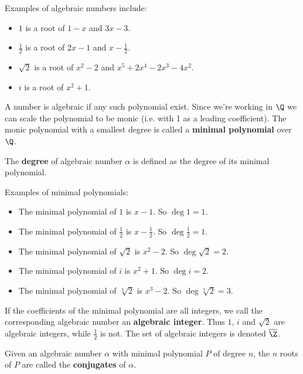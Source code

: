 \begin{ex} Examples of algebraic numbers include:
\begin{itemize}
\item $1$ is a root of $1-x$ and $3x-3$.
\item $\frac{1}{2}$ is a root of $2x - 1$ and $x - \frac{1}{2}$.
\item $\sqrt{2}$ is a root of $x^2 - 2$ and $x^5 + 2x^4 - 2x^3 - 4x^2$.
\item $i$ is a root of $x^2 + 1$.
\end{itemize}
\end{ex}

\begin{df}
A number is algebraic if any such polynomial exist. Since we're working in $\Q$ we can scale the polynomial to be monic (i.e. with 1 as a leading coefficient). The monic polynomial with a smallest degree is called a \textbf{minimal polynomial} over $\Q$.
\end{df}

\begin{df}
The \textbf{degree} of algebraic number $\alpha$ is defined as the degree of its minimal polynomial.
\end{df}

\begin{ex} Examples of minimal polynomials:
\begin{itemize}
\item The minimal polynomial of $1$ is $x-1$. So $\deg 1 = 1$.
\item The minimal polynomial of $\frac{1}{2}$ is $x - \frac{1}{2}$. So $\deg \frac{1}{2} = 1$.
\item The minimal polynomial of $\sqrt{2}$ is $x^2 - 2$. So $\deg \sqrt{2} = 2$.
\item The minimal polynomial of $i$ is $x^2 + 1$. So $\deg i = 2$.
\item The minimal polynomial of $\sqrt[3]{2}$ is $x^3 - 2$. So $\deg \sqrt[3]{2} = 3$.
\end{itemize}
\end{ex}

\begin{df}
If the coefficients of the minimal polynomial are all integers, we call the corresponding algebraic number an \textbf{algebraic integer}. Thus $1$, $i$ and $\sqrt{2}$ are algebraic integers, while $\frac{1}{2}$ is not.
The set of algebraic integers is denoted $\overline{\Z}$.
\end{df}

\begin{df}
Given an algebraic number $\alpha$ with minimal polynomial $P$ of degree $n$, the $n$ roots of $P$ are called the \textbf{conjugates} of $\alpha$.
\end{df}

